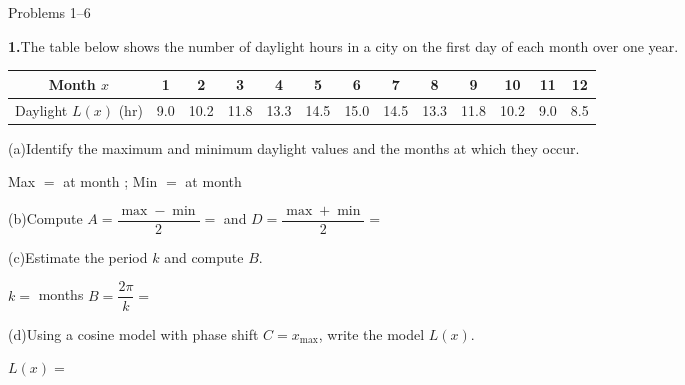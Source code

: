 \documentclass[10pt]{article}
\begin{document}
\namedateperiod

\vspace{0.10in}

\begin{notesbox}{Problems 1--6}

\textbf{1.}\quad The table below shows the number of daylight hours in a city
on the first day of each month over one year.

\vspace{4pt}
\begin{center}
\renewcommand{\arraystretch}{1.35}
\small
\begin{tabular}{|c|c|c|c|c|c|c|c|c|c|c|c|c|}
\hline
Month $x$ & 1 & 2 & 3 & 4 & 5 & 6 & 7 & 8 & 9 & 10 & 11 & 12 \\
\hline
Daylight $L(x)$ (hr) & 9.0 & 10.2 & 11.8 & 13.3 & 14.5 & 15.0 & 14.5 & 13.3 & 11.8 & 10.2 & 9.0 & 8.5 \\
\hline
\end{tabular}
\end{center}

\vspace{4pt}
(a)\quad Identify the maximum and minimum daylight values and the months at which they occur.

Max $= $ \underline{\hspace{1.5cm}} at month \underline{\hspace{1cm}};
\quad Min $= $ \underline{\hspace{1.5cm}} at month \underline{\hspace{1cm}}

\vspace{4pt}
(b)\quad Compute $A = \dfrac{\max - \min}{2} = $ \underline{\hspace{3cm}}
and $D = \dfrac{\max + \min}{2} = $ \underline{\hspace{3cm}}

\vspace{4pt}
(c)\quad Estimate the period $k$ and compute $B$.

$k = $ \underline{\hspace{1.5cm}} months \qquad $B = \dfrac{2\pi}{k} = $ \underline{\hspace{3cm}}

\vspace{4pt}
(d)\quad Using a cosine model with phase shift $C = x_{\max}$, write the model $L(x)$.

$L(x) = $ \underline{\hspace{8cm}}


\end{notesbox}
\end{document}
